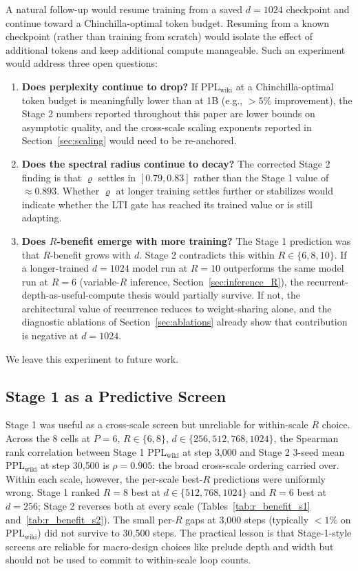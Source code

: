 \documentclass{article}
\newcommand{\pplwiki}{PPL$_\text{wiki}$}
\begin{document}
A natural follow-up would resume training from a saved $d{=}1024$ checkpoint and continue toward a Chinchilla-optimal token budget. Resuming from a known checkpoint (rather than training from scratch) would isolate the effect of additional tokens and keep additional compute manageable. Such an experiment would address three open questions:

\begin{enumerate}[leftmargin=*, topsep=2pt, itemsep=1pt]
  \item \textbf{Does perplexity continue to drop?} If \pplwiki{} at a Chinchilla-optimal token budget is meaningfully lower than at 1B (e.g., $> 5\%$ improvement), the Stage 2 numbers reported throughout this paper are lower bounds on asymptotic quality, and the cross-scale scaling exponents reported in Section~\ref{sec:scaling} would need to be re-anchored.
  \item \textbf{Does the spectral radius continue to decay?} The corrected Stage 2 finding is that $\varrho$ settles in $[0.79, 0.83]$ rather than the Stage 1 value of $\approx 0.893$. Whether $\varrho$ at longer training settles further or stabilizes would indicate whether the LTI gate has reached its trained value or is still adapting.
  \item \textbf{Does $R$-benefit emerge with more training?} The Stage 1 prediction was that $R$-benefit grows with $d$. Stage 2 contradicts this within $R \in \{6, 8, 10\}$. If a longer-trained $d{=}1024$ model run at $R{=}10$ outperforms the same model run at $R{=}6$ (variable-$R$ inference, Section~\ref{sec:inference_R}), the recurrent-depth-as-useful-compute thesis would partially survive. If not, the architectural value of recurrence reduces to weight-sharing alone, and the diagnostic ablations of Section~\ref{sec:ablations} already show that contribution is negative at $d{=}1024$.
\end{enumerate}

We leave this experiment to future work.

\subsection{Stage 1 as a Predictive Screen}

Stage 1 was useful as a cross-scale screen but unreliable for within-scale $R$ choice. Across the 8 cells at $P{=}6$, $R \in \{6, 8\}$, $d \in \{256, 512, 768, 1024\}$, the Spearman rank correlation between Stage 1 \pplwiki{} at step 3{,}000 and Stage 2 3-seed mean \pplwiki{} at step 30{,}500 is $\rho = 0.905$: the broad cross-scale ordering carried over. Within each scale, however, the per-scale best-$R$ predictions were uniformly wrong. Stage 1 ranked $R{=}8$ best at $d \in \{512, 768, 1024\}$ and $R{=}6$ best at $d{=}256$; Stage 2 reverses both at every scale (Tables~\ref{tab:r_benefit_s1} and~\ref{tab:r_benefit_s2}). The small per-$R$ gaps at 3{,}000 steps (typically $<1\%$ on \pplwiki) did not survive to 30{,}500 steps. The practical lesson is that Stage-1-style screens are reliable for macro-design choices like prelude depth and width but should not be used to commit to within-scale loop counts.
\end{document}

